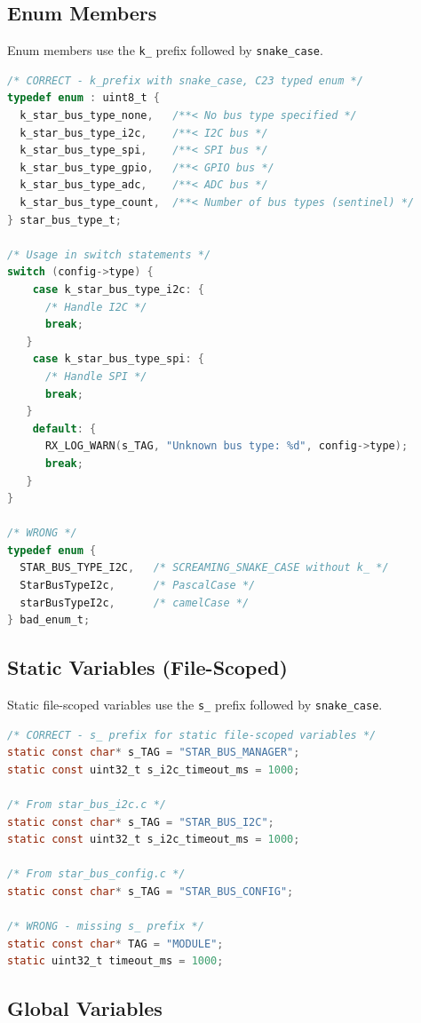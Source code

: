 \subsection{Enum Members}

Enum members use the \texttt{k\_} prefix followed by \texttt{snake\_case}.

\begin{lstlisting}[language=C]
/* CORRECT - k_prefix with snake_case, C23 typed enum */
typedef enum : uint8_t {
  k_star_bus_type_none,   /**< No bus type specified */
  k_star_bus_type_i2c,    /**< I2C bus */
  k_star_bus_type_spi,    /**< SPI bus */
  k_star_bus_type_gpio,   /**< GPIO bus */
  k_star_bus_type_adc,    /**< ADC bus */
  k_star_bus_type_count,  /**< Number of bus types (sentinel) */
} star_bus_type_t;

/* Usage in switch statements */
switch (config->type) {
    case k_star_bus_type_i2c: {
      /* Handle I2C */
      break;
   }
    case k_star_bus_type_spi: {
      /* Handle SPI */
      break;
   }
    default: {
      RX_LOG_WARN(s_TAG, "Unknown bus type: %d", config->type);
      break;
   }
}

/* WRONG */
typedef enum {
  STAR_BUS_TYPE_I2C,   /* SCREAMING_SNAKE_CASE without k_ */
  StarBusTypeI2c,      /* PascalCase */
  starBusTypeI2c,      /* camelCase */
} bad_enum_t;
\end{lstlisting}

\subsection{Static Variables (File-Scoped)}

Static file-scoped variables use the \texttt{s\_} prefix followed by \texttt{snake\_case}.

\begin{lstlisting}[language=C]
/* CORRECT - s_ prefix for static file-scoped variables */
static const char* s_TAG = "STAR_BUS_MANAGER";
static const uint32_t s_i2c_timeout_ms = 1000;

/* From star_bus_i2c.c */
static const char* s_TAG = "STAR_BUS_I2C";
static const uint32_t s_i2c_timeout_ms = 1000;

/* From star_bus_config.c */
static const char* s_TAG = "STAR_BUS_CONFIG";

/* WRONG - missing s_ prefix */
static const char* TAG = "MODULE";
static uint32_t timeout_ms = 1000;
\end{lstlisting}

\subsection{Global Variables}

